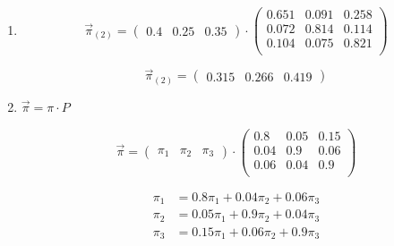 \documentclass{templateNote}
\begin{document}
\begin{center}
\begin{enumerate}[label=\alph*)]
        \item 
        \begin{equation*}
            \vec{\pi}_{(2)}= 
            \begin{pmatrix}
                0.4 & 0.25 & 0.35 
            \end{pmatrix}
            \cdot 
            \begin{pmatrix}
                0.651 & 0.091 & 0.258 \\
                0.072 & 0.814 & 0.114 \\
                0.104 & 0.075 & 0.821 \\
            \end{pmatrix}
        \end{equation*}

        \begin{equation*}
            \vec{\pi}_{(2)}= 
            \begin{pmatrix}
                0.315 & 0.266 & 0.419
            \end{pmatrix} 
        \end{equation*}

        \item $\vec{\pi} = \pi \cdot P$

        \begin{equation*}
            \vec{\pi}= 
            \begin{pmatrix}
                \pi_1 & \pi_2 & \pi_3
            \end{pmatrix} 
            \cdot
            \begin{pmatrix}
                0.8 & 0.05 & 0.15 \\
                0.04 & 0.9 & 0.06 \\
                0.06 & 0.04 & 0.9 \\
            \end{pmatrix} 
        \end{equation*}
        
        \begin{align*}
            \pi_1 &= 0.8\pi_1 + 0.04\pi_2 + 0.06\pi_3 \\
            \pi_2 &= 0.05\pi_1 + 0.9\pi_2 + 0.04\pi_3 \\
            \pi_3 &= 0.15\pi_1 + 0.06\pi_2 + 0.9\pi_3 \\
        \end{align*}
        
        

\end{enumerate}
\end{center}
\end{document}
